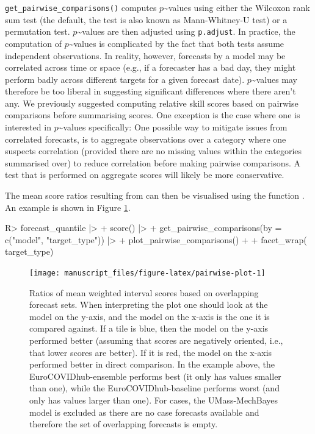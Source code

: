\documentclass[
]{jss}
\begin{document}
\texttt{get\_pairwise\_comparisons()} computes
\(p\)\textasciitilde values using either the Wilcoxon rank sum test (the
default, the test is also known as Mann-Whitney-U test)
\citep{mannTestWhetherOne1947} or a permutation test.
\(p\)\textasciitilde values are then adjusted using \texttt{p.adjust}.
In practice, the computation of \(p\)\textasciitilde values is
complicated by the fact that both tests assume independent observations.
In reality, however, forecasts by a model may be correlated across time
or space (e.g., if a forecaster has a bad day, they might perform badly
across different targets for a given forecast date).
\(p\)\textasciitilde values may therefore be too liberal in suggesting
significant differences where there aren't any. We previously suggested
computing relative skill scores based on pairwise comparisons before
summarising scores. One exception is the case where one is interested in
\(p\)\textasciitilde values specifically: One possible way to mitigate
issues from correlated forecasts, is to aggregate observations over a
category where one suspects correlation (provided there are no missing
values within the categories summarised over) to reduce correlation
before making pairwise comparisons. A test that is performed on
aggregate scores will likely be more conservative.

The mean score ratios resulting from  can
then be visualised using the function
. An example is shown in Figure
\ref{fig:pairwise-plot}.

\begin{CodeChunk}
\begin{CodeInput}
R> forecast_quantile |>
+   score() |>
+   get_pairwise_comparisons(by = c("model", "target_type")) |>
+   plot_pairwise_comparisons() + 
+   facet_wrap(~ target_type)
\end{CodeInput}
\begin{figure}

{\centering \texttt{[image: manuscript\_files/figure-latex/pairwise-plot-1]} 

}

\caption[Ratios of mean weighted interval scores based on overlapping forecast sets]{Ratios of mean weighted interval scores based on overlapping forecast sets. When interpreting the plot one should look at the model on the y-axis, and the model on the x-axis is the one it is compared against. If a tile is blue, then the model on the y-axis performed better (assuming that scores are negatively oriented, i.e., that lower scores are better). If it is red, the model on the x-axis performed better in direct comparison. In the example above, the EuroCOVIDhub-ensemble performs best (it only has values smaller than one), while the EuroCOVIDhub-baseline performs worst (and only has values larger than one). For cases, the UMass-MechBayes model is excluded as there are no case forecasts available and therefore the set of overlapping forecasts is empty.}\label{fig:pairwise-plot}
\end{figure}
\end{CodeChunk}
\end{document}

